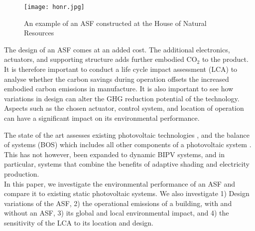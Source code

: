 \begin{figure}
\begin{center}
\texttt{[image: honr.jpg]}
\caption{An example of an ASF constructed at the House of Natural Resources \cite{nagy2015frontiers}}
\label{fig:HoNR}
\end{center}
\end{figure}

The design of an ASF comes at an added cost. The additional electronics, actuators, and supporting structure adds further embodied CO$_2$ to the product. It is therefore important to conduct a life cycle impact assessment (LCA) to analyse whether the carbon savings during operation offsets the increased embodied carbon emissions in manufacture. It is also important to see how variations in design can alter the GHG reduction potential of the technology. Aspects such as the chosen actuator, control system, and location of operation can have a significant impact on its environmental performance. 

The state of the art assesses existing photovoltaic technologies \cite{raugei2007life} \cite{de2013energy} \cite{fthenakis2011photovoltaics}, and the balance of systems (BOS) which includes all other components of a photovoltaic system \cite{mason2006energy}. This has not however, been expanded to dynamic BIPV systems, and in particular, systems that combine the benefits of adaptive shading and electricity production.\\



In this paper, we investigate the environmental performance of an ASF and compare it to existing static photovoltaic systems. We also investigate 1) Design variations of the ASF, 2) the operational emissions of a building, with and without an ASF, 3) its global and local environmental impact, and 4) the sensitivity of the LCA to its location and design.



